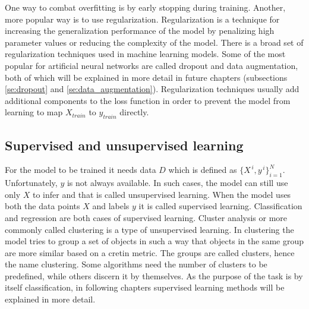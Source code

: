 \documentclass[times, utf8, diplomski]{fer}
\begin{document}
One way to combat overfitting is by early stopping during training. Another, more popular way is to use regularization. Regularization is a technique for increasing the generalization performance of the model by penalizing high parameter values or reducing the complexity of the model. There is a broad set of regularization techniques used in machine learning models. Some of the most popular for artificial neural networks are called dropout \citep{srivastava_dropout:_2014} and data augmentation, both of which will be explained in more detail in future chapters (subsections \ref{se:dropout} and \ref{se:data_augmentation}). Regularization techniques usually add additional components to the loss function in order to prevent the model from learning to map $X_{train}$ to $y_{train}$ directly.


\subsection{Supervised and unsupervised learning}
For the model to be trained it needs data $D$ which is defined as $\{{X}^{\,i},y^{\,i}\}^{N}_{i=1}$. Unfortunately, $y$ is not always available. In such cases, the model can still use only $X$ to infer and that is called unsupervised learning. When the model uses both the data points $X$ and labels $y$ it is called supervised learning. Classification and regression are both cases of supervised learning. Cluster analysis or more commonly called clustering is a type of unsupervised learning. In clustering the model tries to group a set of objects in such a way that objects in the same group are more similar based on a cretin metric. The groups are called clusters, hence the name clustering. Some algorithms need the number of clusters to be predefined, while others discern it by themselves. As the purpose of the task is by itself classification, in following chapters supervised learning methods will be explained in more detail.
\end{document}
